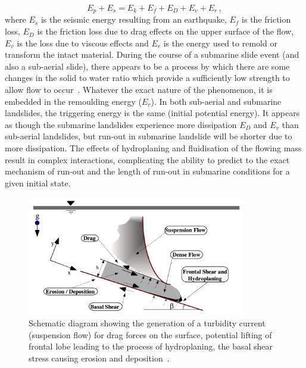 \begin{equation}
E_p + E_s = E_k + E_f + E_D + E_v + E_r\,,
\end{equation}
where $E_s$ is the seismic energy resulting from an earthquake, $E_f$ is the 
friction loss, $E_D$ is the friction loss due to drag effects on the upper 
surface of the flow, $E_v$ is the loss due to viscous effects and $E_r$ is the 
energy used to remold or transform the intact material. During the course of a 
submarine slide event (and also a sub-aerial slide), there appears to be a 
process by which there are some changes in the solid to water ratio which 
provide a sufficiently low strength to allow flow to occur~\citep{Locat2002}. 
Whatever the exact nature of the phenomenon, it is embedded in the remoulding 
energy ($E_r$). In both sub-aerial and submarine landslides, the triggering 
energy is the same (initial potential energy). It appears as though the 
submarine landslides experience more dissipation $E_D$ and $E_v$ than 
sub-aerial landslides, but  run-out in submarine landslide will be 
shorter due to more dissipation. The effects of hydroplaning and fluidisation 
of the flowing mass result in complex interactions, complicating the ability to 
predict to the exact mechanism of run-out and the length of run-out in 
submarine conditions for a given initial state. 

\begin{figure}[tbhp]
\centering
\includegraphics[width=0.85\textwidth]{Submarine_landslide}
\caption[Complex interactions in a submarine landslide]{Schematic diagram 
showing the generation of a turbidity current (suspension flow) for drag forces 
on the surface, potential lifting of frontal lobe leading to the process of 
hydroplaning, the basal shear stress causing erosion and 
deposition~\citep{Locat2002}.}
\label{fig:Submarine_landslide}
\end{figure}

